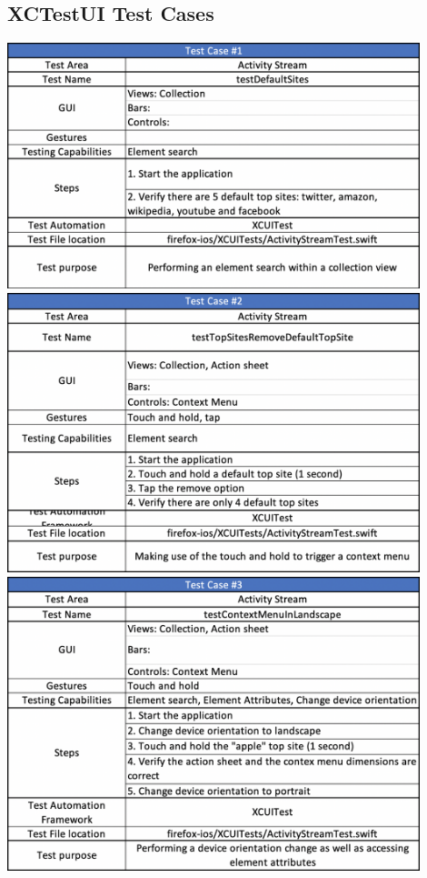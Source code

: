 \subsection{XCTestUI Test Cases}
\includegraphics[width=12cm]{img/tc1.png} \\[2mm]
\includegraphics[width=12cm]{img/tc2.png} \\[2mm]
\includegraphics[width=12cm]{img/tc3.png} \\[2mm]
